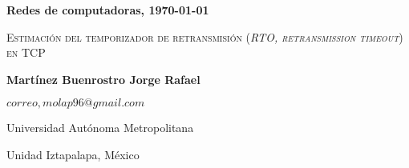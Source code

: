 \documentclass[letterpaper,11pt,twoside]{report}
\date{}
\begin{document}
	\centerline{\bf Redes de computadoras, \today}
	\centerline{}
	\begin{center}
		\Large{\textsc{Estimaci\'on del temporizador de retransmisi\'on (\emph{RTO, retransmission timeout}) en TCP}}
	\end{center}
	
	\centerline{}
	\centerline{\textbf{Martínez Buenrostro Jorge Rafael}}
	\centerline{}
	
	\centerline{$correo, molap96@gmail.com$}
	
        \centerline{Universidad Aut\'onoma Metropolitana} 
	\centerline{Unidad Iztapalapa, M\'exico}
	
	\bigskip
    
    
		
\end{document}
